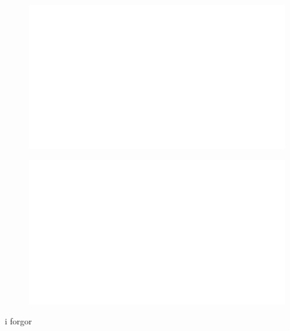 \begin{centering}
    \begin{figure}[h]
        \centering
        \includegraphics[width=\textwidth]{whyareyoucheckingthenameofthisfile.png}
    \end{figure}
\end{centering}

\begin{centering}
    \begin{figure}
        \centering
        \includegraphics[width=\textwidth]{whyareyoucheckingthenameofthisfile.png}
    \end{figure}
\end{centering}
\noindent



i forgor
